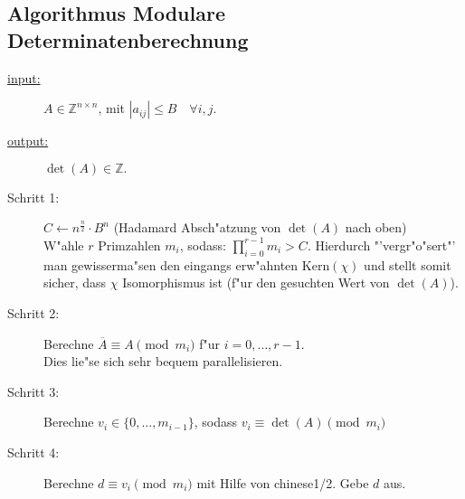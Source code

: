 \documentclass{article}
\newcommand{\Kern}[1]{\ensuremath{\mathrm{Kern}(#1)}}
\begin{document}
\subsection*{Algorithmus Modulare Determinatenberechnung}
\begin{description}
	\item[\underline{input:}] $A \in \mathbb{Z}^{n \times n}$, mit $|a_{ij}| \le B \quad \forall i,j.$
	\item[\underline{output:}] $\det(A) \in \mathbb{Z}.$
	\item[Schritt 1:] $C \longleftarrow n^{\frac{n}{2}} \cdot B^n$ (Hadamard Absch"atzung von $\det(A)$ nach oben) \\
		W"ahle $r$ Primzahlen $m_i$, sodass: $\prod_{i=0}^{r-1} m_i > C$. Hierdurch "'vergr"o"sert"' man gewisserma"sen
		den eingangs erw"ahnten $\Kern{\chi}$ und stellt somit sicher, dass $\chi$ Isomorphismus ist
		(f"ur den gesuchten Wert von $\det(A)$).
	\item[Schritt 2:] Berechne $\overline{A} \equiv A \pmod {m_i}$ f"ur $i=0, \dots, r-1.$ \\
		Dies lie"se sich sehr bequem parallelisieren.
	\item[Schritt 3:] Berechne $v_i \in \lbrace 0, \dots, m_{i-1} \rbrace$, sodass $v_i \equiv \det(A) \pmod {m_i}$
	\item[Schritt 4:] Berechne $d \equiv v_i \pmod {m_i}$ mit Hilfe von chinese1/2. Gebe $d$ aus.
\end{description}
\end{document}
